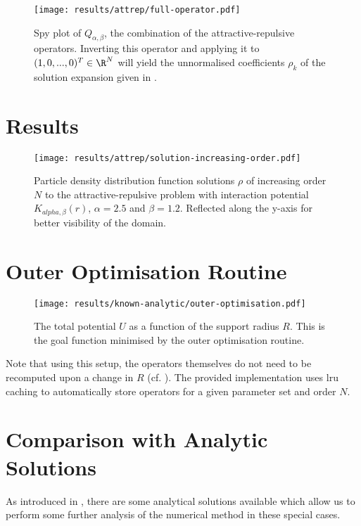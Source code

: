 \begin{figure}[H]
  \centering
  \label{fig:attrep-operator}
  \texttt{[image: results/attrep/full-operator.pdf]}
  \caption[Combination of the attractive-repulsive operators]{Spy plot of $Q_{\alpha, \beta}$, the combination of the attractive-repulsive operators. Inverting this operator and applying it to $(1, 0, ..., 0)^T \in \R^N$ will yield the unnormalised coefficients $\rho_k$ of the solution expansion given in .}
\end{figure}

\section{Results}
\begin{figure}[H]
  \centering
  \label{fig:solution-increasing-order}
  \texttt{[image: results/attrep/solution-increasing-order.pdf]}
  \caption[Solutions of increasing orders]{Particle density distribution function solutions $\rho$ of increasing order $N$ to the attractive-repulsive problem with interaction potential $K_{alpha, \beta}(r)$, $\alpha = 2.5$ and $\beta = 1.2$. Reflected along the y-axis for better visibility of the domain.}
\end{figure}

\section{Outer Optimisation Routine}
\begin{figure}[H]
  \centering
  \label{fig:outer-optimisation}
  \texttt{[image: results/known-analytic/outer-optimisation.pdf]}
  \caption[Outer Optimisation Routine]{The total potential $U$ as a function of the support radius $R$. This is the goal function minimised by the outer optimisation routine.}
\end{figure}

Note that using this setup, the operators themselves do not need to be recomputed upon a change in $R$ (cf. ).
The provided implementation uses \gls{lru} caching to automatically store operators for a given parameter set and order $N$.

\section{Comparison with Analytic Solutions}
As introduced in , there are some analytical solutions available which allow us to perform some further analysis of the numerical method in these special cases.

